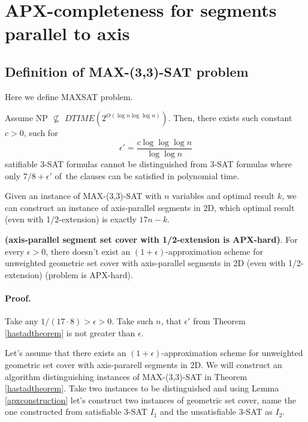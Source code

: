 \section{APX-completeness for segments parallel to axis}
\label{section:segment_apx}

\subsection{Definition of  MAX-(3,3)-SAT problem}
Here we define MAXSAT problem.

\begin{tw}{
	\label{hastadtheorem}
	\textbf{\cite{hastad}}
	Assume NP $\not\subseteq$ $DTIME(2^{O(\log n \log \log n)})$.
	Then, there exists such constant $c > 0$, such for
	$$\epsilon' = \frac{c \log \log \log n}{\log \log n}$$ 
	satifiable 3-SAT formulas cannot be distinguished from
	3-SAT formulas where only $7/8+\epsilon'$ of~the clauses
	can be satisfied in polynomial time.
}\end{tw}

\begin{lemma}{
	\label{apxconstruction}
	Given an instance of  MAX-(3,3)-SAT 
	with $n$ variables and optimal result $k$,
	we can construct an instance of axis-parallel segments in 2D,
	which optimal result (even with 1/2-extension) is exactly $17n - k$.
}\end{lemma}

\begin{tw}{
	\textbf{(axis-parallel segment set cover with 1/2-extension is APX-hard)}.	
	For every $\epsilon > 0$,
	there doesn't exist an $(1+\epsilon)$-approximation scheme
	for unweighted geometric set cover
	with axis-parallel segments in 2D (even with 1/2-extension)
	(problem is APX-hard).
}\end{tw}

\paragraph{Proof.}
Take any $1/(17 \cdot 8) > \epsilon > 0$.
Take such $n$, that $\epsilon'$ from Theorem \ref{hastadtheorem}
is not greater than $\epsilon$.

Let's assume that there exists an $(1+\epsilon)$-approximation scheme
for unweighted geometric set cover with axis-pararell segments in 2D.
We will construct an algorithm distinguishing instances of MAX-(3,3)-SAT
in Theorem \ref{hastadtheorem}.
Take two instances to be distinguished and using
Lemma \ref{apxconstruction}
let's construct two instances of geometric set cover,
name the one constructed from satisfiable 3-SAT $I_1$
and the unsatisfiable 3-SAT as $I_2$.

